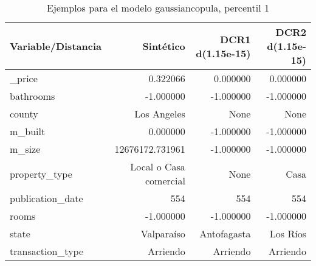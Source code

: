 \begin{table}[H]
\centering
\fontsize{10}{14}\selectfont
\caption{Ejemplos para el modelo gaussiancopula, percentil 1}
\label{table-example-economicos-b-3-gaussiancopula-1p}
\begin{tabular}{|l|r|r|r|}
\hline
\rowcolor[gray]{0.8}
Variable/Distancia & Sintético & DCR1 d(1.15e-15) & DCR2 d(1.15e-15) \\
\hline \_price & \cellcolor[rgb]{0.9, 0.54, 0.52} 0.322066 & \cellcolor[rgb]{0.9, 0.54, 0.52} 0.000000 & \cellcolor[rgb]{0.9, 0.54, 0.52} 0.000000 \\
\hline bathrooms & \cellcolor[rgb]{0.9, 0.54, 0.52} -1.000000 & \cellcolor[rgb]{0.9, 0.54, 0.52} -1.000000 & \cellcolor[rgb]{0.9, 0.54, 0.52} -1.000000 \\
\hline county & \cellcolor[rgb]{0.9, 0.54, 0.52} Los Angeles & None & None \\
\hline m\_built & \cellcolor[rgb]{0.9, 0.54, 0.52} 0.000000 & \cellcolor[rgb]{0.9, 0.54, 0.52} -1.000000 & \cellcolor[rgb]{0.9, 0.54, 0.52} -1.000000 \\
\hline m\_size & \cellcolor[rgb]{0.9, 0.54, 0.52} 12676172.731961 & -1.000000 & -1.000000 \\
\hline property\_type & \cellcolor[rgb]{0.9, 0.54, 0.52} Local o Casa comercial & None & Casa \\
\hline publication\_date & \cellcolor[rgb]{0.9, 0.54, 0.52} 554 & \cellcolor[rgb]{0.9, 0.54, 0.52} 554 & \cellcolor[rgb]{0.9, 0.54, 0.52} 554 \\
\hline rooms & \cellcolor[rgb]{0.9, 0.54, 0.52} -1.000000 & \cellcolor[rgb]{0.9, 0.54, 0.52} -1.000000 & \cellcolor[rgb]{0.9, 0.54, 0.52} -1.000000 \\
\hline state & \cellcolor[rgb]{0.9, 0.54, 0.52} Valparaíso & Antofagasta & Los Ríos \\
\hline transaction\_type & \cellcolor[rgb]{0.9, 0.54, 0.52} Arriendo & \cellcolor[rgb]{0.9, 0.54, 0.52} Arriendo & \cellcolor[rgb]{0.9, 0.54, 0.52} Arriendo \\
\hline
\end{tabular}
\end{table}
